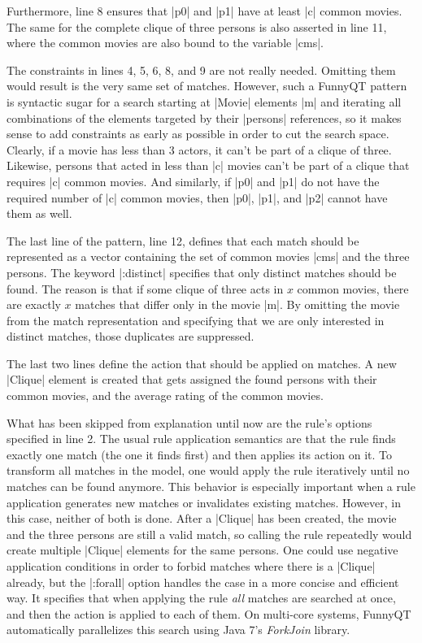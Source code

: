 \documentclass[a4paper]{article}
\newcommand{\code}{\clojureinline}
\begin{document}
Furthermore, line 8 ensures that \code|p0| and \code|p1| have at least \code|c|
common movies.  The same for the complete clique of three persons is also
asserted in line 11, where the common movies are also bound to the variable
\code|cms|.

The constraints in lines 4, 5, 6, 8, and 9 are not really needed.  Omitting
them would result is the very same set of matches.  However, such a FunnyQT
pattern is syntactic sugar for a search starting at \code|Movie| elements
\code|m| and iterating all combinations of the elements targeted by their
\code|persons| references, so it makes sense to add constraints as early as
possible in order to cut the search space.  Clearly, if a movie has less than 3
actors, it can't be part of a clique of three.  Likewise, persons that acted in
less than \code|c| movies can't be part of a clique that requires \code|c|
common movies.  And similarly, if \code|p0| and \code|p1| do not have the
required number of \code|c| common movies, then \code|p0|, \code|p1|, and
\code|p2| cannot have them as well.

The last line of the pattern, line 12, defines that each match should be
represented as a vector containing the set of common movies \code|cms| and the
three persons.  The keyword \code|:distinct| specifies that only distinct
matches should be found.  The reason is that if some clique of three acts in
\(x\)
common movies, there are exactly \(x\)
matches that differ only in the movie \code|m|.  By omitting the movie from the
match representation and specifying that we are only interested in distinct
matches, those duplicates are suppressed.

The last two lines define the action that should be applied on matches.  A new
\code|Clique| element is created that gets assigned the found persons with
their common movies, and the average rating of the common movies.

What has been skipped from explanation until now are the rule's options
specified in line 2.  The usual rule application semantics are that the rule
finds exactly one match (the one it finds first) and then applies its action on
it.  To transform all matches in the model, one would apply the rule
iteratively until no matches can be found anymore.  This behavior is especially
important when a rule application generates new matches or invalidates existing
matches.  However, in this case, neither of both is done.  After a
\code|Clique| has been created, the movie and the three persons are still a
valid match, so calling the rule repeatedly would create multiple \code|Clique|
elements for the same persons.  One could use negative application conditions
in order to forbid matches where there is a \code|Clique| already, but the
\code|:forall| option handles the case in a more concise and efficient way.  It
specifies that when applying the rule \emph{all} matches are searched at once,
and then the action is applied to each of them.  On multi-core systems, FunnyQT
automatically parallelizes this search using Java 7's \emph{ForkJoin} library.
\end{document}
